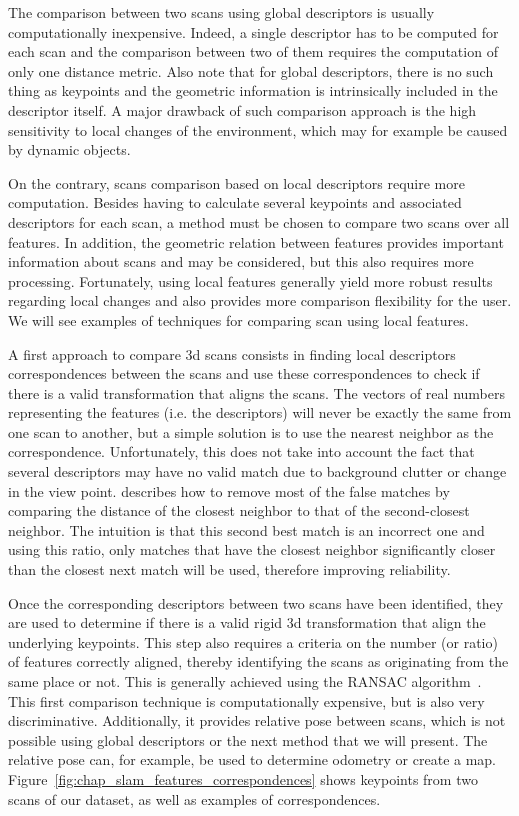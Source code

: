 The comparison between two scans using global descriptors is usually computationally inexpensive. Indeed, a single descriptor has to be computed for each scan and the comparison between two of them requires the computation of only one distance metric. Also note that for global descriptors, there is no such thing as keypoints and the geometric information is intrinsically included in the descriptor itself. A major drawback of such comparison approach is the high sensitivity to local changes of the environment, which may for example be caused by dynamic objects.

On the contrary, scans comparison based on local descriptors require more computation. Besides having to calculate several keypoints and associated descriptors for each scan, a method must be chosen to compare two scans over all features. In addition, the geometric relation between features provides important information about scans and may be considered, but this also requires more processing. Fortunately, using local features generally yield more robust results regarding local changes and also provides more comparison flexibility for the user. We will see examples of techniques for comparing scan using local features.

A first approach to compare \gls*{3d} scans consists in finding local descriptors correspondences between the scans and use these correspondences to check if there is a valid transformation that aligns the scans. The vectors of real numbers representing the features (i.e. the descriptors) will never be exactly the same from one scan to another, but a simple solution is to use the nearest neighbor as the correspondence. Unfortunately, this does not take into account the fact that several descriptors may have no valid match due to background clutter or change in the view point. \cite[Section 7.1]{Lowe2004} describes how to remove most of the false matches by comparing the distance of the closest neighbor to that of the second-closest neighbor. The intuition is that this second best match is an incorrect one and using this ratio, only matches that have the closest neighbor significantly closer than the closest next match will be used, therefore improving reliability.

Once the corresponding descriptors between two scans have been identified, they are used to determine if there is a valid rigid \gls*{3d} transformation that align the underlying keypoints. This step also requires a criteria on the number (or ratio) of features correctly aligned, thereby identifying the scans as originating from the same place or not. This is generally achieved using the RANSAC algorithm~\cite{Fischler1981}. This first comparison technique is computationally expensive, but is also very discriminative. Additionally, it provides relative pose between scans, which is not possible using global descriptors or the next method that we will present. The relative pose can, for example, be used to determine odometry or create a map. Figure~\ref{fig:chap_slam_features_correspondences} shows keypoints from two scans of our dataset, as well as examples of correspondences.

